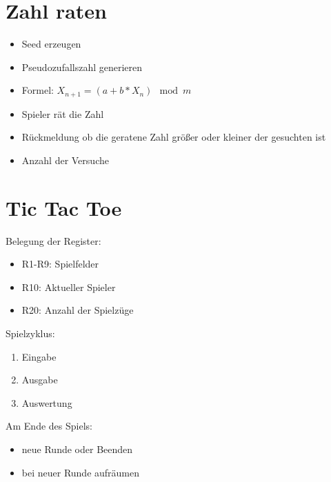 \section{Zahl raten}

\begin{frame}{\insertsection}%
  \begin{itemize}
   \item Seed erzeugen
   \item Pseudozufallszahl generieren
   \item Formel: $X_{n+1} = (a + b*X_n) \mod m$
   \item Spieler rät die Zahl
   \item Rückmeldung ob die geratene Zahl größer oder kleiner der gesuchten ist
   \item Anzahl der Versuche
  \end{itemize}
\end{frame}


\section{Tic Tac Toe}

\begin{frame}{\insertsection}
 Belegung der Register:
  \begin{itemize}
   \item R1-R9: Spielfelder
   \item R10: Aktueller Spieler
   \item R20: Anzahl der Spielzüge
  \end{itemize}

 Spielzyklus:
  \begin{enumerate}
  \item Eingabe
  \item Ausgabe
  \item Auswertung
  \end{enumerate}


Am Ende des Spiels:
\begin{itemize}
 \item neue Runde oder Beenden
 \item bei neuer Runde aufräumen
\end{itemize}
\end{frame}



